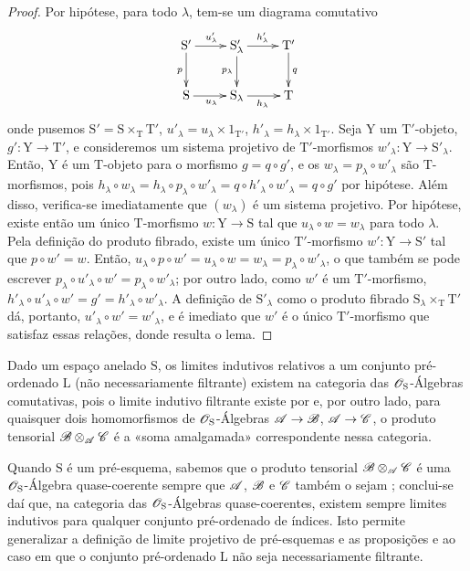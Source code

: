 \begin{proof}
Por hipótese, para todo $\lambda$, tem-se um diagrama comutativo
\[
\xymatrix{
  \mathrm{S}' \ar[r]^{u'_\lambda} \ar[d]_p & \mathrm{S}'_\lambda \ar[r]^{h'_\lambda} \ar[d]_{p_\lambda} & \mathrm{T}' \ar[d]^q \\
  \mathrm{S} \ar[r]_{u_\lambda} & \mathrm{S}_\lambda \ar[r]_{h_\lambda} & \mathrm{T}
}
\]
onde pusemos $\mathrm{S}'=\mathrm{S}\times_\mathrm{T}\mathrm{T}'$, $u'_\lambda=u_\lambda\times 1_{\mathrm{T}'}$, $h'_\lambda=h_\lambda\times 1_{\mathrm{T}'}$.
Seja $\mathrm{Y}$ um $\mathrm{T}'$-objeto, $g':\mathrm{Y}\to\mathrm{T}'$, e consideremos um sistema projetivo de $\mathrm{T}'$-morfismos $w'_\lambda:\mathrm{Y}\to\mathrm{S}'_\lambda$.
Então, $\mathrm{Y}$ é um $\mathrm{T}$-objeto para o morfismo $g=q\circ g'$, e os $w_\lambda=p_\lambda\circ w'_\lambda$ são $\mathrm{T}$-morfismos, pois $h_\lambda\circ w_\lambda=h_\lambda\circ p_\lambda\circ w'_\lambda=q\circ h'_\lambda\circ w'_\lambda=q\circ g'$ por hipótese.
Além disso, verifica-se imediatamente que $(w_\lambda)$ é um sistema projetivo.
Por hipótese, existe então um único $\mathrm{T}$-morfismo $w:\mathrm{Y}\to\mathrm{S}$ tal que $u_\lambda\circ w=w_\lambda$ para todo $\lambda$.
Pela definição do produto fibrado, existe um único $\mathrm{T}'$-morfismo $w':\mathrm{Y}\to\mathrm{S}'$ tal que $p\circ w'=w$.
Então, $u_\lambda\circ p\circ w'=u_\lambda\circ w=w_\lambda=p_\lambda\circ w'_\lambda$, o que também se pode escrever $p_\lambda\circ u'_\lambda\circ w'=p_\lambda\circ w'_\lambda$; por outro lado, como $w'$ é um $\mathrm{T}'$-morfismo, $h'_\lambda\circ u'_\lambda\circ w'=g'=h'_\lambda\circ w'_\lambda$. A definição de $\mathrm{S}'_\lambda$ como o produto fibrado $\mathrm{S}_\lambda\times_\mathrm{T}\mathrm{T}'$ dá, portanto, $u'_\lambda\circ w'=w'_\lambda$, e é imediato que $w'$ é o único $\mathrm{T}'$-morfismo que satisfaz essas relações, donde resulta o lema.
\end{proof}

\begin{remark}[8.2.7]
\label{IV.8.2.7}
Dado um espaço anelado $\mathrm{S}$, os limites indutivos relativos a um conjunto pré-ordenado $\mathrm{L}$ (não necessariamente filtrante) existem na categoria das $\mathscr{O}_\mathrm{S}$-Álgebras comutativas, pois o limite indutivo filtrante existe por  e, por outro lado, para quaisquer dois homomorfismos de $\mathscr{O}_\mathrm{S}$-Álgebras $\sh{A}\to\sh{B}$, $\sh{A}\to\sh{C}$, o produto tensorial $\mathscr{B}\otimes_{\mathscr{A}}\mathscr{C}$ é a «soma amalgamada» correspondente nessa categoria.

Quando $\mathrm{S}$ é um pré-esquema, sabemos que o produto tensorial $\mathscr{B}\otimes_{\mathscr{A}}\mathscr{C}$ é uma $\mathscr{O}_\mathrm{S}$-Álgebra quase-coerente sempre que $\mathscr{A}$, $\mathscr{B}$ e $\mathscr{C}$ também o sejam ; conclui-se daí que, na categoria das $\mathscr{O}_\mathrm{S}$-Álgebras quase-coerentes, existem sempre limites indutivos para qualquer conjunto pré-ordenado de índices.
Isto permite generalizar a definição de limite projetivo de pré-esquemas e as proposições  e  ao caso em que o conjunto pré-ordenado $\mathrm{L}$ não seja necessariamente filtrante.
\end{remark}

